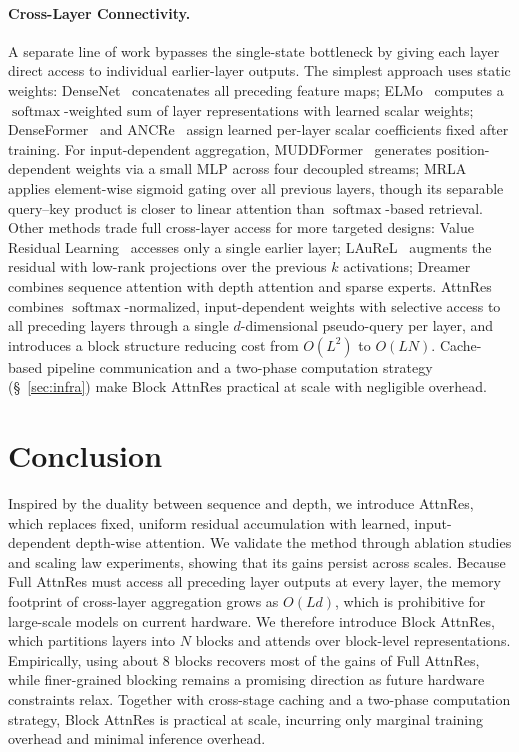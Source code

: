 \paragraph{Cross-Layer Connectivity.}
A separate line of work bypasses the single-state bottleneck by giving each layer direct access to individual earlier-layer outputs.
The simplest approach uses static weights: DenseNet~\citep{huang2018densenet} concatenates all preceding feature maps; ELMo~\citep{peters-etal-2018-deep} computes a $\operatorname{softmax}$-weighted sum of layer representations with learned scalar weights; DenseFormer~\citep{pagliardini2024denseformer} and ANCRe~\citep{zhang2026ancre} assign learned per-layer scalar coefficients fixed after training.
For input-dependent aggregation, MUDDFormer~\citep{xiao2025muddformer} generates position-dependent weights via a small MLP across four decoupled streams;
MRLA~\citep{fang2023cross} applies element-wise sigmoid gating over all previous layers, though its separable query--key product is closer to linear attention than $\operatorname{softmax}$-based retrieval.
Other methods trade full cross-layer access for more targeted designs:
Value Residual Learning~\citep{zhou-etal-2025-value} accesses only a single earlier layer;
LAuReL~\citep{menghani2025laurel} augments the residual with low-rank projections over the previous $k$ activations;
Dreamer~\citep{knupp2026depthrecurrent} combines sequence attention with depth attention and sparse experts.
AttnRes combines $\operatorname{softmax}$-normalized, input-dependent weights with selective access to all preceding layers through a single $d$-dimensional pseudo-query per layer, and introduces a block structure reducing cost from $O(L^2)$ to $O(LN)$.
Cache-based pipeline communication and a two-phase computation strategy (\S~\ref{sec:infra}) make Block AttnRes practical at scale with negligible overhead.

\section*{Conclusion}

Inspired by the duality between sequence and depth, we introduce AttnRes, which replaces fixed, uniform residual accumulation with learned, input-dependent depth-wise attention. We validate the method through ablation studies and scaling law experiments, showing that its gains persist across scales. Because Full AttnRes must access all preceding layer outputs at every layer, the memory footprint of cross-layer aggregation grows as $O(Ld)$, which is prohibitive for large-scale models on current hardware. We therefore introduce Block AttnRes, which partitions layers into $N$ blocks and attends over block-level representations. Empirically, using about 8 blocks recovers most of the gains of Full AttnRes, while finer-grained blocking remains a promising direction as future hardware constraints relax. Together with cross-stage caching and a two-phase computation strategy, Block AttnRes is practical at scale, incurring only marginal training overhead and minimal inference overhead.



